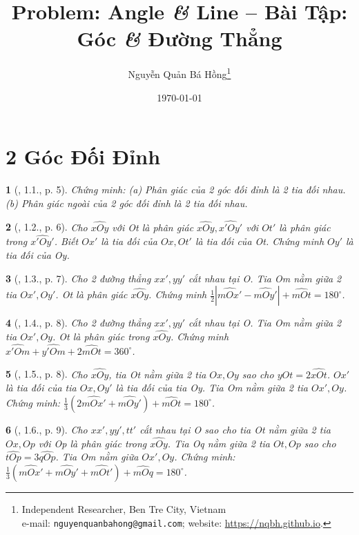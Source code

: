\documentclass{article}
\title{Problem: Angle {\it\&} Line -- Bài Tập: Góc {\it\&} Đường Thẳng}
\author{Nguyễn Quản Bá Hồng\footnote{Independent Researcher, Ben Tre City, Vietnam\\e-mail: \texttt{nguyenquanbahong@gmail.com}; website: \url{https://nqbh.github.io}.}}
\date{\today}
\newtheorem{baitoan}{}
\begin{document}
\maketitle
\tableofcontents


\section{2 Góc Đối Đỉnh}

\begin{baitoan}[\cite{Hung_Mai_Toan_7_hinh_hoc}, 1.1., p. 5]
	Chứng minh: (a) Phân giác của 2 góc đối đỉnh là 2 tia đối nhau. (b) Phân giác ngoài của 2 góc đối đỉnh là 2 tia đối nhau.
\end{baitoan}

\begin{baitoan}[\cite{Hung_Mai_Toan_7_hinh_hoc}, 1.2., p. 6]
	Cho $\widehat{xOy}$ với Ot là phân giác $\widehat{xOy},\widehat{x'Oy'}$ với $Ot'$ là phân giác trong $\widehat{x'Oy'}$. Biết $Ox'$ là tia đối của $Ox,Ot'$ là tia đối của Ot. Chứng minh $Oy'$ là tia đối của Oy.
\end{baitoan}

\begin{baitoan}[\cite{Hung_Mai_Toan_7_hinh_hoc}, 1.3., p. 7]
	Cho 2 đường thẳng $xx',yy'$ cắt nhau tại O. Tia Om nằm giữa 2 tia $Ox',Oy'$. Ot là phân giác $\widehat{xOy}$. Chứng minh $\frac{1}{2}|\widehat{mOx'} - \widehat{mOy'}| + \widehat{mOt} = 180^\circ$.
\end{baitoan}

\begin{baitoan}[\cite{Hung_Mai_Toan_7_hinh_hoc}, 1.4., p. 8]
	Cho 2 đường thẳng $xx',yy'$ cắt nhau tại O. Tia Om nằm giữa 2 tia $Ox',Oy$. Ot là phân giác trong $\widehat{xOy}$. Chứng minh $\widehat{x'Om} + \widehat{y'Om} + 2\widehat{mOt} = 360^\circ$.
\end{baitoan}

\begin{baitoan}[\cite{Hung_Mai_Toan_7_hinh_hoc}, 1.5., p. 8]
	Cho $\widehat{xOy}$, tia Ot nằm giữa 2 tia $Ox,Oy$ sao cho $\widehat{yOt} = 2\widehat{xOt}$. $Ox'$ là tia đối của tia $Ox,Oy'$ là tia đối của tia Oy. Tia Om nằm giữa 2 tia $Ox',Oy$. Chứng minh: $\frac{1}{3}(2\widehat{mOx'} + \widehat{mOy'}) + \widehat{mOt} = 180^\circ$.
\end{baitoan}

\begin{baitoan}[\cite{Hung_Mai_Toan_7_hinh_hoc}, 1.6., p. 9]
	Cho $xx',yy',tt'$ cắt nhau tại O sao cho tia Ot nằm giữa 2 tia $Ox,Op$ với Op là phân giác trong $\widehat{xOy}$. Tia Oq nằm giữa 2 tia $Ot,Op$ sao cho $\widehat{tOp} = 3\widehat{qOp}$. Tia Om nằm giữa $Ox',Oy$. Chứng minh: $\frac{1}{3}(\widehat{mOx'} + \widehat{mOy'} + \widehat{mOt'}) + \widehat{mOq} = 180^\circ$.
\end{baitoan}
\end{document}
